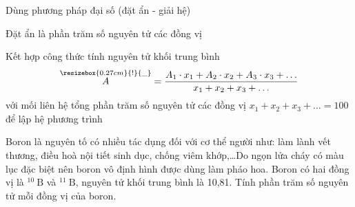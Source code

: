 \begin{pp}
	Dùng phương pháp đại số (đặt ẩn - giải hệ)
	\begin{cacbuoc}
		\item Đặt ẩn là phần trăm số nguyên tử các đồng vị
		\item Kết hợp công thức tính nguyên tử khối trung bình
		\[\overset{\resizebox{0.27cm}{!}{\_}}{A} = \dfrac{A_1\cdot x_1+ A_2\cdot x_2 + A_3\cdot x_3 + \ldots}{x_1+ x_2 + x_3 +\ldots}\] với mối liên hệ tổng phần trăm số nguyên tử các đồng vị $x_1 +x_2 + x_3 +\ldots =100$ để lập hệ phương trình
	\end{cacbuoc}
\end{pp}
\begin{vd}
	Boron là nguyên tố có nhiều tác dụng đối với cơ thể người như: làm lành vết thương, điều hoà nội tiết sinh dục, chống viêm khớp,\ldots Do ngọn lửa cháy có màu lục đặc biệt nên boron vô định hình được dùng làm pháo hoa. Boron có hai đồng vị là $^{10} \mathrm{~B}$ và $^{11} \mathrm{~B}$, nguyên tử khối trung bình là 10,81. Tính phần trăm số nguyên tử mỗi đồng vị của boron.
\end{vd}

